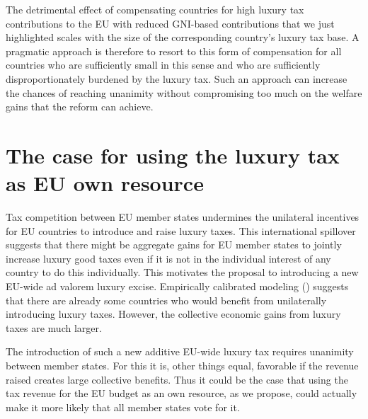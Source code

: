 \documentclass[../../main]{subfiles}
\begin{document}
The detrimental effect of compensating countries for high luxury tax contributions to the EU with reduced GNI-based contributions that we just highlighted scales with the size of the corresponding country's luxury tax base. A pragmatic approach is therefore to resort to this form of compensation for all countries who are sufficiently small in this sense and who are sufficiently disproportionately burdened by the luxury tax. Such an approach can increase the chances of reaching unanimity without compromising too much on the welfare gains that the reform can achieve.

\section{The case for using the luxury tax as EU own resource}

Tax competition between EU member states undermines the unilateral incentives for EU countries to introduce and raise luxury taxes. This international spillover suggests that there might be aggregate gains for EU member states to jointly increase luxury good taxes even if it is not in the individual interest of any country to do this individually. This motivates the proposal to introducing a new EU-wide ad valorem luxury excise. Empirically calibrated modeling (\citet{Xie2026}) suggests that there are already some countries who would benefit from unilaterally introducing luxury taxes. However, the collective economic gains from luxury taxes are much larger.

The introduction of such a new additive EU-wide luxury tax%
requires unanimity between member states. %
For this it is, other things equal, favorable if the revenue raised creates large collective benefits. Thus it could be the case that using the tax revenue for the EU budget as an own resource, as we propose, could actually make it more likely that all member states vote for it.
\end{document}
